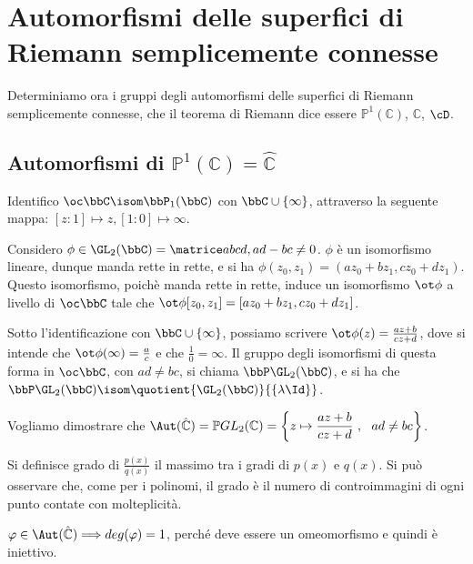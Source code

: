 \chapter{Automorfismi delle superfici di Riemann semplicemente connesse}

Determiniamo ora i gruppi degli automorfismi delle superfici di Riemann semplicemente
connesse, che il teorema di Riemann dice essere $\mathbb{P}^1(\mathbb{C})$, $\mathbb{C}$, $\cD$.


\section{Automorfismi di $\mathbb{P}^1(\mathbb{C})=\hat{\mathbb{C}}$}

Identifico $\oc\bbC\isom\bbP_1(\bbC)$ con $\bbC\cup\{\infty\}$, attraverso la seguente mappa: $[z:1]\mapsto z, [1:0]\mapsto\infty$.

Considero $\phi\in\GL_2(\bbC)=\matrice abcd, ad-bc \neq 0$. $\phi$ è un isomorfismo lineare, dunque manda rette in rette, e si ha $\phi(z_0,z_1)=(az_0+bz_1,cz_0+dz_1)$. Questo isomorfismo, poichè manda rette in rette, induce un isomorfismo $\ot \phi$ a livello di $\oc\bbC$ tale che $\ot\phi[z_0,z_1]=[az_0+bz_1,cz_0+dz_1]$.

Sotto l'identificazione con $\bbC\cup\{\infty\}$, possiamo scrivere $\ot\phi(z)=\frac{az+b}{cz+d}$, dove si intende che $\ot\phi(\infty)=\frac{a}{c}$ e che $\frac{1}{0}=\infty$. Il gruppo degli isomorfismi di questa forma in $\oc \bbC$, con $ad\neq bc$, si chiama $\bbP\GL_2(\bbC)$, e si ha che $\bbP\GL_2(\bbC)\isom\quotient{\GL_2(\bbC)}{\{\lambda\Id\}}$.

Vogliamo dimostrare che $\Aut( \hat{\mathbb{C}} )= \mathbb{P}GL_2 (\mathbb{C} )=\left\{z\mapsto \displaystyle{\frac{az+b}{cz+d}} \ ,\ \  ad\neq bc\right\}$.

\begin{definizione}
Si definisce grado di $\frac{p(x)}{q(x)}$ il massimo tra i gradi di $p(x)$ e $q(x)$.
Si può osservare che, come per i polinomi, il grado è il numero di controimmagini di ogni punto contate con molteplicità.
\end{definizione}

\begin{osservazione}
$\varphi \in \Aut( \hat{\mathbb{C}} ) \Longrightarrow deg(\varphi )=1$, perché deve essere un omeomorfismo e quindi è iniettivo.
\end{osservazione}


